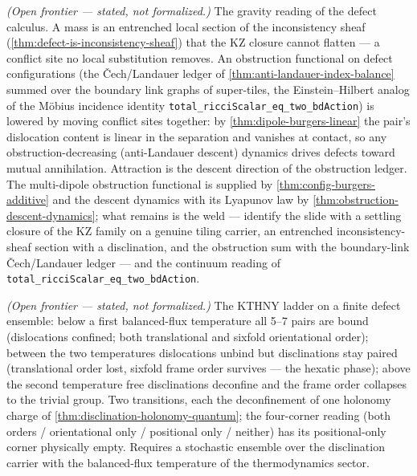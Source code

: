 \begin{theorem}\label{thm:gravity-obstruction-descent}\notready{}
\emph{(Open frontier --- stated, not formalized.)} The gravity reading of
the defect calculus. A mass is an entrenched local section of the
inconsistency sheaf (\cref{thm:defect-is-inconsistency-sheaf}) that the KZ
closure cannot flatten --- a conflict site no local substitution removes.
An obstruction functional on defect configurations (the \v{C}ech/Landauer
ledger of \cref{thm:anti-landauer-index-balance} summed over the boundary
link graphs of super-tiles, the Einstein--Hilbert analog of the M\"obius
incidence identity \texttt{total\_ricciScalar\_eq\_two\_bdAction}) is
lowered by moving conflict sites together: by
\cref{thm:dipole-burgers-linear} the pair's dislocation content is linear
in the separation and vanishes at contact, so any obstruction-decreasing
(anti-Landauer descent) dynamics drives defects toward mutual
annihilation. Attraction is the descent direction of the obstruction
ledger. The multi-dipole obstruction functional is supplied by
\cref{thm:config-burgers-additive} and the descent dynamics with its
Lyapunov law by \cref{thm:obstruction-descent-dynamics}; what remains is
the weld --- identify the slide with a settling closure of the KZ family
on a genuine tiling carrier, an entrenched inconsistency-sheaf section
with a disclination, and the obstruction sum with the boundary-link
\v{C}ech/Landauer ledger --- and the continuum reading of
\texttt{total\_ricciScalar\_eq\_two\_bdAction}.
\end{theorem}

\begin{theorem}\label{thm:kthny-defect-unbinding}\notready{}
\emph{(Open frontier --- stated, not formalized.)} The KTHNY ladder on a finite
defect ensemble: below a first balanced-flux temperature all 5--7 pairs are bound
(dislocations confined; both translational and sixfold orientational order);
between the two temperatures dislocations unbind but disclinations stay paired
(translational order lost, sixfold frame order survives --- the hexatic phase);
above the second temperature free disclinations deconfine and the frame order
collapses to the trivial group. Two transitions, each the deconfinement of one
holonomy charge of \cref{thm:disclination-holonomy-quantum}; the four-corner
reading (both orders / orientational only / positional only / neither) has its
positional-only corner physically empty. Requires a stochastic ensemble over the
disclination carrier with the balanced-flux temperature of the thermodynamics
sector.
\end{theorem}


